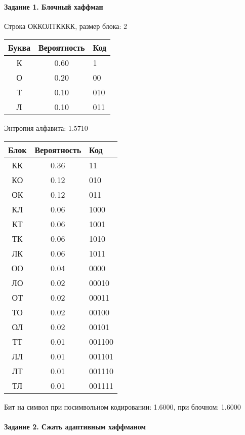 \documentclass[a4paper, 12pt]{article}
\begin{document}
\paragraph{Задание 1. Блочный хаффман \\}

Строка ОККОЛТКККК, размер блока: 2
\begin{center}
 \begin{tabular}{ |c|c|l| } 
  \hline
     Буква & Вероятность & Код\\ \hline
К & 0.60 & 1\\\hline
О & 0.20 & 00\\\hline
Т & 0.10 & 010\\\hline
Л & 0.10 & 011
\\ \hline \end{tabular}
\end{center}
Энтропия алфавита: 1.5710
\begin{center}
 \begin{tabular}{ |c|c|l| } 
  \hline
     Блок & Вероятность & Код\\ \hline
КК & 0.36 & 11\\\hline
КО & 0.12 & 010\\\hline
ОК & 0.12 & 011\\\hline
КЛ & 0.06 & 1000\\\hline
КТ & 0.06 & 1001\\\hline
ТК & 0.06 & 1010\\\hline
ЛК & 0.06 & 1011\\\hline
ОО & 0.04 & 0000\\\hline
ЛО & 0.02 & 00010\\\hline
ОТ & 0.02 & 00011\\\hline
ТО & 0.02 & 00100\\\hline
ОЛ & 0.02 & 00101\\\hline
ТТ & 0.01 & 001100\\\hline
ЛЛ & 0.01 & 001101\\\hline
ЛТ & 0.01 & 001110\\\hline
ТЛ & 0.01 & 001111
\\ \hline \end{tabular}
\end{center}
Бит на символ при посимвольном кодировании: 1.6000, при блочном: 1.6000


\pagebreak
\paragraph{Задание 2. Сжать адаптивным хаффманом\\}
\end{document}
